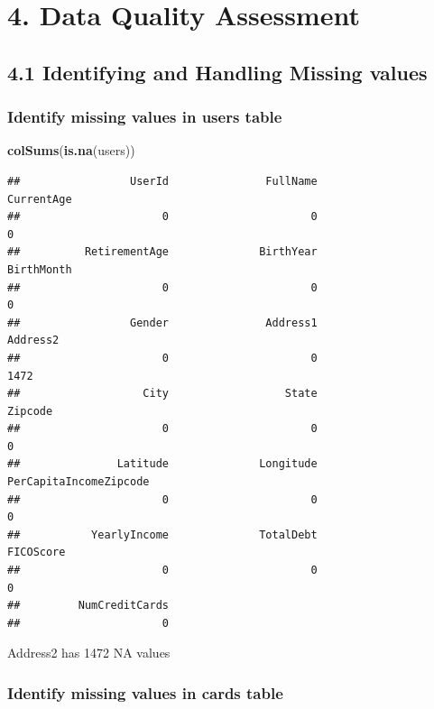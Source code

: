 \documentclass[
]{article}
\newenvironment{Shaded}{\begin{snugshade}}{\end{snugshade}}
\newcommand{\FunctionTok}[1]{\textcolor[rgb]{0.13,0.29,0.53}{\textbf{#1}}}
\newcommand{\NormalTok}[1]{#1}
\begin{document}
\section{4. Data Quality Assessment}\label{data-quality-assessment}

\subsection{4.1 Identifying and Handling Missing
values}\label{identifying-and-handling-missing-values}

\subsubsection{Identify missing values in users
table}\label{identify-missing-values-in-users-table}

\begin{Shaded}
\begin{Highlighting}[]
\FunctionTok{colSums}\NormalTok{(}\FunctionTok{is.na}\NormalTok{(users))}
\end{Highlighting}
\end{Shaded}

\begin{verbatim}
##                 UserId               FullName             CurrentAge 
##                      0                      0                      0 
##          RetirementAge              BirthYear             BirthMonth 
##                      0                      0                      0 
##                 Gender               Address1               Address2 
##                      0                      0                   1472 
##                   City                  State                Zipcode 
##                      0                      0                      0 
##               Latitude              Longitude PerCapitaIncomeZipcode 
##                      0                      0                      0 
##           YearlyIncome              TotalDebt              FICOScore 
##                      0                      0                      0 
##         NumCreditCards 
##                      0
\end{verbatim}

Address2 has 1472 NA values

\subsubsection{Identify missing values in cards
table}\label{identify-missing-values-in-cards-table}
\end{document}
